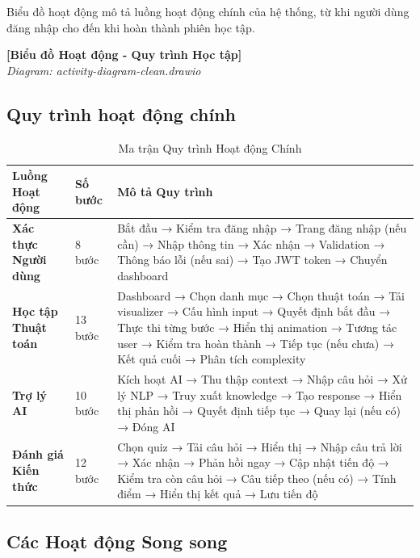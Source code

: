 Biểu đồ hoạt động mô tả luồng hoạt động chính của hệ thống, từ khi người dùng đăng nhập cho đến khi hoàn thành phiên học tập.

\begin{center}
\textbf{[Biểu đồ Hoạt động - Quy trình Học tập]}\\
\textit{Diagram: activity-diagram-clean.drawio}
\end{center}

\subsection{Quy trình hoạt động chính}

\begin{table}[H]
\centering
\caption{Ma trận Quy trình Hoạt động Chính}
\label{tab:main-activity-flows}
\begin{tabular}{|p{3cm}|p{1.5cm}|p{8.5cm}|}
\hline
\textbf{Luồng Hoạt động} & \textbf{Số bước} & \textbf{Mô tả Quy trình} \\
\hline
\textbf{Xác thực Người dùng} & 8 bước & 
Bắt đầu → Kiểm tra đăng nhập → Trang đăng nhập (nếu cần) → Nhập thông tin → Xác nhận → Validation → Thông báo lỗi (nếu sai) → Tạo JWT token → Chuyển dashboard \\
\hline
\textbf{Học tập Thuật toán} & 13 bước & 
Dashboard → Chọn danh mục → Chọn thuật toán → Tải visualizer → Cấu hình input → Quyết định bắt đầu → Thực thi từng bước → Hiển thị animation → Tương tác user → Kiểm tra hoàn thành → Tiếp tục (nếu chưa) → Kết quả cuối → Phân tích complexity \\
\hline
\textbf{Trợ lý AI} & 10 bước & 
Kích hoạt AI → Thu thập context → Nhập câu hỏi → Xử lý NLP → Truy xuất knowledge → Tạo response → Hiển thị phản hồi → Quyết định tiếp tục → Quay lại (nếu có) → Đóng AI \\
\hline
\textbf{Đánh giá Kiến thức} & 12 bước & 
Chọn quiz → Tải câu hỏi → Hiển thị → Nhập câu trả lời → Xác nhận → Phản hồi ngay → Cập nhật tiến độ → Kiểm tra còn câu hỏi → Câu tiếp theo (nếu có) → Tính điểm → Hiển thị kết quả → Lưu tiến độ \\
\hline
\end{tabular}
\end{table}

\subsection{Các Hoạt động Song song}

